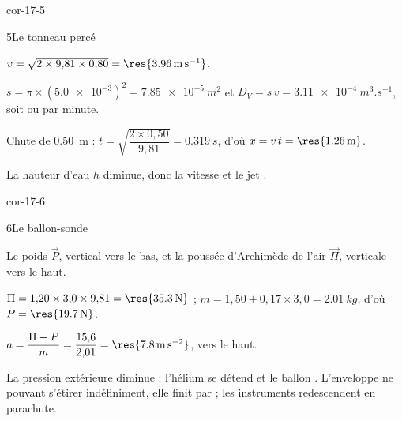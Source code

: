\begin{blocLivre}{cor-17-5}
\begin{corrige}{5}{Le tonneau percé}
\begin{questions}
\item $v=\sqrt{2\times9{,}81\times0{,}80}=\res{\qty{3,96}{m.s^{-1}}}$.
\item $s=\pi\times(\num{5.0e-3})^2=\qty{7,85e-5}{m^2}$ et $D_V=s\,v=\qty{3,11e-4}{m^3.s^{-1}}$, soit  ou
 par minute.
\item Chute de \qty{0,50}{m} : $t=\sqrt{\dfrac{2\times0{,}50}{9{,}81}}=\qty{0,319}{s}$, d'où $x=v\,t=\res{\qty{1,26}{m}}$.
\item La hauteur d'eau $h$ diminue, donc la vitesse  et le jet .
\end{questions}
\end{corrige}
\end{blocLivre}
\begin{blocLivre}{cor-17-6}
\begin{corrige}{6}{Le ballon-sonde}
\begin{questions}
\item Le poids $\vec{P}$, vertical vers le bas, et la poussée d'Archimède de l'air $\vec{\Pi}$, verticale vers le haut.
\item $\Pi=1{,}20\times3{,}0\times9{,}81=\res{\qty{35,3}{N}}$ ; $m=1{,}50+0{,}17\times3{,}0=\qty{2,01}{kg}$, d'où
$P=\res{\qty{19,7}{N}}$.
\item $a=\dfrac{\Pi-P}{m}=\dfrac{15{,}6}{2{,}01}=\res{\qty{7,8}{m.s^{-2}}}$, vers le haut.
\item La pression extérieure diminue : l'hélium se détend et le ballon . L'enveloppe ne pouvant s'étirer
indéfiniment, elle finit par  ; les instruments redescendent en parachute.
\end{questions}
\end{corrige}
\end{blocLivre}
